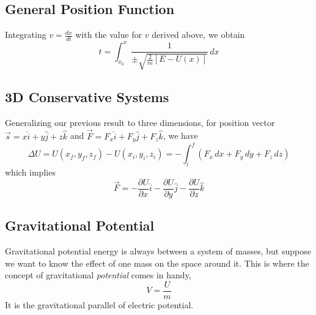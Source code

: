 \documentclass[../PhysicsFormulae.tex]{subfiles}
\begin{document}
\subsection{General Position Function}
Integrating $v=\frac{dx}{dt}$ with the value for $v$ derived above, we obtain
\[ t = \int_{x_0}^{x} \frac{1}{\pm \sqrt{\frac{2}{m}[E-U(x)]}} \,dx \]

\subsection{3D Conservative Systems}
Generalizing our previous result to three dimensions, for position vector $\vec{s}=x\hat{i}+y\hat{j}+z\hat{k}$ and $\vec{F}=F_x\hat{i}+F_y\hat{j}+F_z\hat{k}$, we have
\[ \Delta U = U(x_f, y_f, z_f) - U(x_i, y_i, z_i) = -\int_i^f (F_x\,dx + F_y\,dy+F_z\,dz) \]
which implies
\[ \vec{F} = -\frac{\partial U}{\partial x}\hat{i} - \frac{\partial U}{\partial y}\hat{j} - \frac{\partial U}{\partial z}\hat{k} \]

\subsection{Gravitational Potential}
Gravitational potential energy is always between a system of masses, but suppose we want to know the effect of one mass on the space around it. This is where the concept of gravitational \textit{potential} comes in handy,
\[ V = \frac{U}{m} \]
It is the gravitational parallel of electric potential. 
\end{document}
